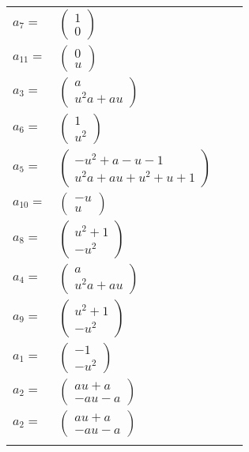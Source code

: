 \documentclass[1p]{elsarticle_modified}
\theoremstyle{definition}
\begin{document}
\begin{tabular}{m{7pt} m{180pt} m{7pt} m{180pt} }
\flushright $a_{7}=$&$\begin{pmatrix}1\\0\end{pmatrix}$ \\
\flushright $a_{11}=$&$\begin{pmatrix}0\\u\end{pmatrix}$ \\
\flushright $a_{3}=$&$\begin{pmatrix}a\\u^2 a+a u\end{pmatrix}$ \\
\flushright $a_{6}=$&$\begin{pmatrix}1\\u^2\end{pmatrix}$ \\
\flushright $a_{5}=$&$\begin{pmatrix}- u^2+a- u-1\\u^2 a+a u+u^2+u+1\end{pmatrix}$ \\
\flushright $a_{10}=$&$\begin{pmatrix}- u\\u\end{pmatrix}$ \\
\flushright $a_{8}=$&$\begin{pmatrix}u^2+1\\- u^2\end{pmatrix}$ \\
\flushright $a_{4}=$&$\begin{pmatrix}a\\u^2 a+a u\end{pmatrix}$ \\
\flushright $a_{9}=$&$\begin{pmatrix}u^2+1\\- u^2\end{pmatrix}$ \\
\flushright $a_{1}=$&$\begin{pmatrix}-1\\- u^2\end{pmatrix}$ \\
\flushright $a_{2}=$&$\begin{pmatrix}a u+a\\- a u- a\end{pmatrix}$\\ \flushright $a_{2}=$&$\begin{pmatrix}a u+a\\- a u- a\end{pmatrix}$\\&\end{tabular}
\end{document}
